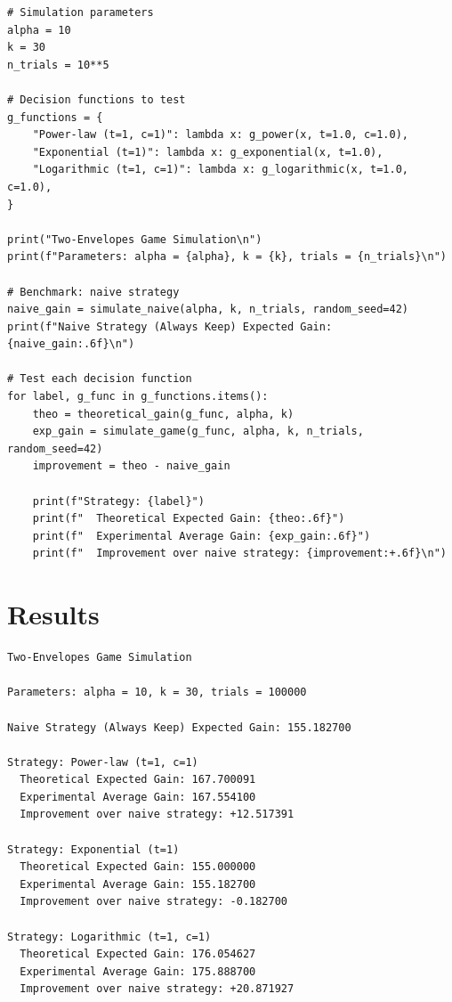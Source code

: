 \begin{solution}
\begin{lstlisting}[style=mypython, caption={Decision Functions and Simulation Code}]
# Simulation parameters
alpha = 10
k = 30
n_trials = 10**5

# Decision functions to test
g_functions = {
    "Power-law (t=1, c=1)": lambda x: g_power(x, t=1.0, c=1.0),
    "Exponential (t=1)": lambda x: g_exponential(x, t=1.0),
    "Logarithmic (t=1, c=1)": lambda x: g_logarithmic(x, t=1.0, c=1.0),
}

print("Two-Envelopes Game Simulation\n")
print(f"Parameters: alpha = {alpha}, k = {k}, trials = {n_trials}\n")

# Benchmark: naive strategy
naive_gain = simulate_naive(alpha, k, n_trials, random_seed=42)
print(f"Naive Strategy (Always Keep) Expected Gain: {naive_gain:.6f}\n")

# Test each decision function
for label, g_func in g_functions.items():
    theo = theoretical_gain(g_func, alpha, k)
    exp_gain = simulate_game(g_func, alpha, k, n_trials, random_seed=42)
    improvement = theo - naive_gain
    
    print(f"Strategy: {label}")
    print(f"  Theoretical Expected Gain: {theo:.6f}")
    print(f"  Experimental Average Gain: {exp_gain:.6f}")
    print(f"  Improvement over naive strategy: {improvement:+.6f}\n")
\end{lstlisting}

    \section{Results}
    \begin{lstlisting}[style=mypython, caption={Simulation Output}]
Two-Envelopes Game Simulation

Parameters: alpha = 10, k = 30, trials = 100000

Naive Strategy (Always Keep) Expected Gain: 155.182700

Strategy: Power-law (t=1, c=1)
  Theoretical Expected Gain: 167.700091
  Experimental Average Gain: 167.554100
  Improvement over naive strategy: +12.517391

Strategy: Exponential (t=1)
  Theoretical Expected Gain: 155.000000
  Experimental Average Gain: 155.182700
  Improvement over naive strategy: -0.182700

Strategy: Logarithmic (t=1, c=1)
  Theoretical Expected Gain: 176.054627
  Experimental Average Gain: 175.888700
  Improvement over naive strategy: +20.871927
\end{lstlisting}
\end{solution}
